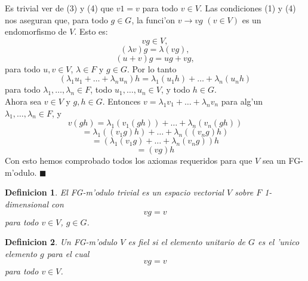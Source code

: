 \documentclass[a4paper,openright,12pt]{report}
\numberwithin{equation}{section} %
\newtheorem{definicion}{Definicion}[section] %
\newenvironment{proof}{\noindent{\it Demostracion:}}{\hfill$\blacksquare$} %
\begin{document}
\begin{proof}
Es trivial ver de (3) y (4) que $v1=v$ para todo $v \in V$. Las condiciones (1) y (4) nos aseguran que, para todo $g \in G$, la funci'on $v \rightarrow vg$ $(v \in V)$ es un endomorfismo de $V$. Esto es:
\[
vg \in V,
\]
\[
(\lambda v)g=\lambda (vg),
\]
\[
(u+v)g=ug+vg,
\]
para todo $u, v \in V$, $\lambda \in F$ y $g \in G$. Por lo tanto
\[
 (\lambda_{1}u_{1}+ \ldots +\lambda_{n}u_{n})h=\lambda_{1}(u_{1}h)+ \ldots +\lambda_{n}(u_{n}h) 
\]
para todo $\lambda_{1}, \ldots ,\lambda_{n} \in F$, todo $u_{1}, \ldots ,u_{n} \in V$, y todo $h \in G$.\\
Ahora sea $v \in V$ y $g, h \in G$. Entonces $v=\lambda_{1}v_{1}+ \ldots +\lambda_{n}v_{n}$ para alg'un $\lambda_{1}, \ldots ,\lambda_{n} \in F$, y
\[
v(gh)=\lambda_{1}(v_{1}(gh))+ \ldots + \lambda_{n}(v_{n}(gh))
\]
\[
=\lambda_{1}((v_{1}g)h)+ \ldots + \lambda_{n}((v_{n}g)h)
\]
\[
=(\lambda_{1}(v_{1}g)+ \ldots + \lambda_{n}(v_{n}g))h
\]
\[
=(vg)h
\]
Con esto hemos comprobado todos los axiomas requeridos para que $V$ sea un FG-m'odulo.
\end{proof}
\begin{definicion}
El FG-m'odulo trivial es un espacio vectorial $V$ sobre $F$ 1-dimensional con
\[
vg=v
\] 
para todo $v \in V$, $g \in G$.
\end{definicion}
\begin{definicion}
Un FG-m'odulo $V$ es fiel si el elemento unitario de $G$ es el 'unico elemento $g$ para el cual
\[
vg=v
\]
para todo $v \in V$.
\end{definicion}
\end{document}
